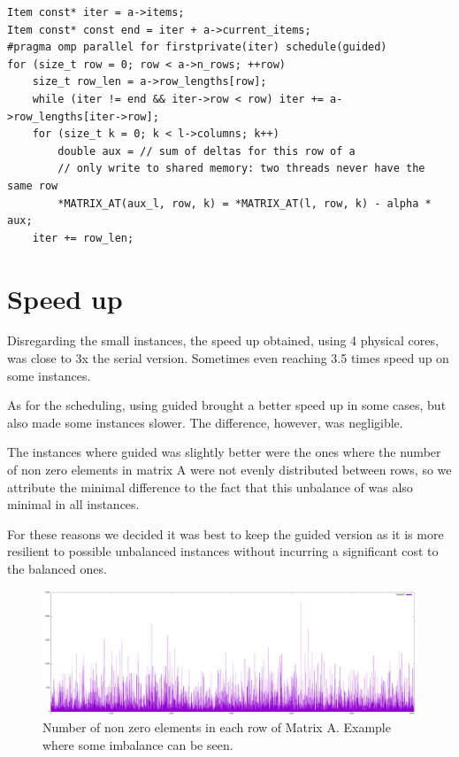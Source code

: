 \documentclass[a4paper]{article}
\begin{document}
\begin{verbatim}
Item const* iter = a->items;
Item const* const end = iter + a->current_items;
#pragma omp parallel for firstprivate(iter) schedule(guided)
for (size_t row = 0; row < a->n_rows; ++row)
    size_t row_len = a->row_lengths[row];
    while (iter != end && iter->row < row) iter += a->row_lengths[iter->row];
    for (size_t k = 0; k < l->columns; k++)
        double aux = // sum of deltas for this row of a
        // only write to shared memory: two threads never have the same row
        *MATRIX_AT(aux_l, row, k) = *MATRIX_AT(l, row, k) - alpha * aux;
    iter += row_len;
\end{verbatim}

\section{Speed up}
Disregarding the small instances, the speed up obtained, using 4 physical cores,
was close to 3x the serial version. Sometimes even reaching 3.5 times speed up
on some instances.

As for the scheduling, using guided brought a better speed up in some cases, but
also made some instances slower. The difference, however, was negligible.

The instances where guided was slightly better were the ones where the number of
non zero elements in matrix A were not evenly distributed between rows, so we
attribute the minimal difference to the fact that this unbalance of was also
minimal in all instances.

For these reasons we decided it was best to keep the guided version as it is more
resilient to possible unbalanced instances without incurring a significant cost
to the balanced ones.

\begin{figure}[H]
    \centering
        \includegraphics[width=\textwidth]{./ML1M.png}
        \caption{Number of non zero elements in each row of Matrix A.
        Example where some imbalance can be seen.}
\end{figure}
\end{document}
